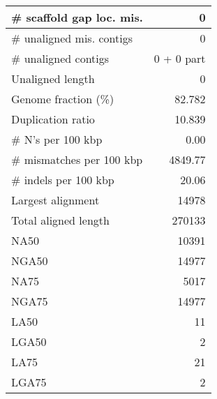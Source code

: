 \documentclass[12pt,a4paper]{article}
\begin{document}
\begin{table}[ht]
\begin{center}
\begin{tabular}{|l*{1}{|r}|}
\# scaffold gap loc. mis. & 0 \\ \hline
\# unaligned mis. contigs & 0 \\ \hline
\# unaligned contigs & 0 + 0 part \\ \hline
Unaligned length & 0 \\ \hline
Genome fraction (\%) & 82.782 \\ \hline
Duplication ratio & 10.839 \\ \hline
\# N's per 100 kbp & 0.00 \\ \hline
\# mismatches per 100 kbp & 4849.77 \\ \hline
\# indels per 100 kbp & 20.06 \\ \hline
Largest alignment & 14978 \\ \hline
Total aligned length & 270133 \\ \hline
NA50 & 10391 \\ \hline
NGA50 & 14977 \\ \hline
NA75 & 5017 \\ \hline
NGA75 & 14977 \\ \hline
LA50 & 11 \\ \hline
LGA50 & 2 \\ \hline
LA75 & 21 \\ \hline
LGA75 & 2 \\ \hline
\end{tabular}
\end{center}
\end{table}
\end{document}
